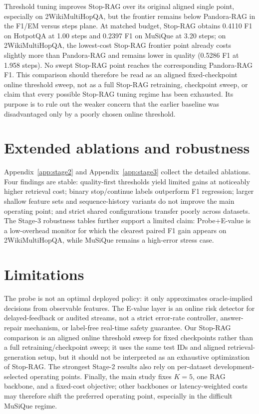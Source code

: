 \documentclass{article}
\newcommand{\method}{Pandora-RAG}
\newcommand{\hotpot}{HotpotQA}
\newcommand{\musique}{MuSiQue}
\newcommand{\twowiki}{2WikiMultiHopQA}
\begin{document}
Threshold tuning improves Stop-RAG over its original aligned single point, especially on \twowiki{}, but the frontier remains below \method{} in the F1/EM versus steps plane. At matched budget, Stop-RAG obtains 0.4110 F1 on \hotpot{} at 1.00 steps and 0.2397 F1 on \musique{} at 3.20 steps; on \twowiki{}, the lowest-cost Stop-RAG frontier point already costs slightly more than \method{} and remains lower in quality (0.5286 F1 at 1.958 steps). No swept Stop-RAG point reaches the corresponding \method{} F1. This comparison should therefore be read as an aligned fixed-checkpoint online threshold sweep, not as a full Stop-RAG retraining, checkpoint sweep, or claim that every possible Stop-RAG tuning regime has been exhausted. Its purpose is to rule out the weaker concern that the earlier baseline was disadvantaged only by a poorly chosen online threshold.

\section{Extended ablations and robustness}
\label{sec:ablations}

Appendix~\ref{app:stage2} and Appendix~\ref{app:stage3} collect the detailed ablations. Four findings are stable: quality-first thresholds yield limited gains at noticeably higher retrieval cost; binary stop/continue labels outperform F1 regression; larger shallow feature sets and sequence-history variants do not improve the main operating point; and strict shared configurations transfer poorly across datasets. The Stage-3 robustness tables further support a limited claim: Probe+E-value is a low-overhead monitor for which the clearest paired F1 gain appears on \twowiki{}, while \musique{} remains a high-error stress case.

\section{Limitations}
\label{sec:limitations}

The probe is not an optimal deployed policy: it only approximates oracle-implied decisions from observable features. The E-value layer is an online risk detector for delayed-feedback or audited streams, not a strict error-rate controller, answer-repair mechanism, or label-free real-time safety guarantee. Our Stop-RAG comparison is an aligned online threshold sweep for fixed checkpoints rather than a full retraining/checkpoint sweep; it uses the same test IDs and aligned retrieval-generation setup, but it should not be interpreted as an exhaustive optimization of Stop-RAG. The strongest Stage-2 results also rely on per-dataset development-selected operating points. Finally, the main study fixes $K=5$, one RAG backbone, and a fixed-cost objective; other backbones or latency-weighted costs may therefore shift the preferred operating point, especially in the difficult \musique{} regime.
\end{document}
